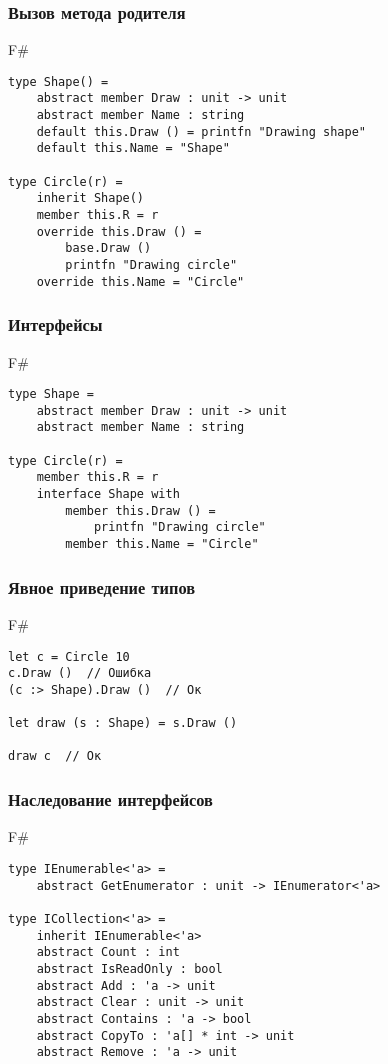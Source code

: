 \documentclass[xetex,mathserif,serif]{beamer}
\begin{document}
	\begin{frame}[fragile]
		\frametitle{Вызов метода родителя}
		\begin{exampleblock}{F\#}
			\begin{verbatim}
type Shape() =
    abstract member Draw : unit -> unit
    abstract member Name : string
    default this.Draw () = printfn "Drawing shape"
    default this.Name = "Shape"

type Circle(r) =
    inherit Shape()
    member this.R = r
    override this.Draw () = 
        base.Draw ()
        printfn "Drawing circle"
    override this.Name = "Circle"
			\end{verbatim}
		\end{exampleblock}
\end{frame}

	\begin{frame}[fragile]
		\frametitle{Интерфейсы}
		\begin{exampleblock}{F\#}
			\begin{verbatim}
type Shape =
    abstract member Draw : unit -> unit
    abstract member Name : string

type Circle(r) =
    member this.R = r
    interface Shape with
        member this.Draw () = 
            printfn "Drawing circle"
        member this.Name = "Circle"
			\end{verbatim}
		\end{exampleblock}
\end{frame}

	\begin{frame}[fragile]
		\frametitle{Явное приведение типов}
		\begin{exampleblock}{F\#}
			\begin{verbatim}
let c = Circle 10
c.Draw ()  // Ошибка
(c :> Shape).Draw ()  // Ок

let draw (s : Shape) = s.Draw ()

draw c  // Ок
			\end{verbatim}
		\end{exampleblock}
\end{frame}

	\begin{frame}[fragile]
		\frametitle{Наследование интерфейсов}
		\begin{exampleblock}{F\#}
			\begin{verbatim}
type IEnumerable<'a> =
    abstract GetEnumerator : unit -> IEnumerator<'a>

type ICollection<'a> =
    inherit IEnumerable<'a>
    abstract Count : int
    abstract IsReadOnly : bool
    abstract Add : 'a -> unit
    abstract Clear : unit -> unit
    abstract Contains : 'a -> bool
    abstract CopyTo : 'a[] * int -> unit
    abstract Remove : 'a -> unit
			\end{verbatim}
		\end{exampleblock}
\end{frame}
\end{document}
